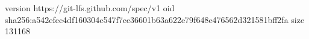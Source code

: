 version https://git-lfs.github.com/spec/v1
oid sha256:a542efec4df160304c547f7ce36601b63a622e79f648e476562d321581bff2fa
size 131168
